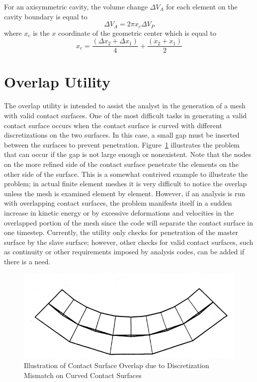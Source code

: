 For an axisymmetric cavity, the volume change $\Delta V_A$ for each
element on the cavity boundary is equal to
\begin{equation}
\Delta V_A = 2\pi x_c \Delta V_P
\end{equation}
where $x_c$ is the $x$ coordinate of the geometric center which is equal
to
\begin{equation}
x_c = \frac{(\Delta x_2 + \Delta x_1)}{4} +
      \frac{(x_2 + x_1)}{2}
\end{equation}

\section{Overlap Utility}\label{sec:overlap}

The overlap utility is intended to assist the analyst in the generation
of a mesh with valid contact surfaces.  One of the most difficult tasks
in generating a valid contact surface occurs when the contact surface is
curved with different discretizations on the two surfaces.  In this
case, a small gap must be inserted between the surfaces to prevent
penetration. Figure~\ref{f:overlap} illustrates the problem that can
occur if the gap is not large enough or nonexistent. Note that the nodes
on the more refined side of the contact surface penetrate the elements
on the other side of the surface.  This is a somewhat contrived example
to illustrate the problem; in actual finite element meshes it is very
difficult to notice the overlap unless the mesh is examined element by
element. However, if an analysis is run with overlapping contact
surfaces, the problem manifests itself in a sudden increase in kinetic
energy or by excessive deformations and velocities in the overlapped
portion of the mesh since the code will separate the contact surface in
one timestep.  Currently, the utility only checks for penetration of the
master surface by the slave surface; however, other checks for valid
contact surfaces, such as continuity or other requirements imposed by
analysis codes, can be added if there is a need.

\begin{figure}
\centering
\includegraphics[scale=0.5]{figures/Overlap.png}
\caption{Illustration of Contact Surface Overlap due to
Discretization Mismatch on Curved Contact Surfaces}
\label{f:overlap}
\end{figure}

